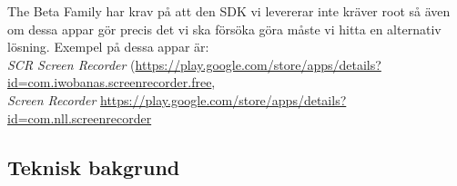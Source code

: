 The Beta Family har krav på att den SDK vi levererar inte kräver root så även om dessa appar gör precis det vi ska försöka göra måste vi hitta en alternativ lösning. 
Exempel på dessa appar är: \\ \emph{SCR Screen Recorder} (\url{https://play.google.com/store/apps/details?id=com.iwobanas.screenrecorder.free}, \\ \emph{Screen Recorder} \url{https://play.google.com/store/apps/details?id=com.nll.screenrecorder}
\subsection{Teknisk bakgrund}
